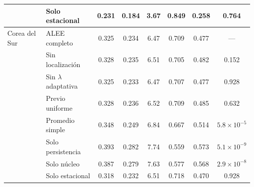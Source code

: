 \begin{longtable}{llcccccc}
 & Solo estacional & 0.231 & 0.184 & 3.67 & 0.849 & 0.258 & 0.764 \\
\midrule
Corea del Sur & ALEE completo & 0.325 & 0.234 & 6.47 & 0.709 & 0.477 & --- \\
 & Sin localización & 0.328 & 0.235 & 6.51 & 0.705 & 0.482 & 0.152 \\
 & Sin $\lambda$ adaptativa & 0.325 & 0.233 & 6.47 & 0.707 & 0.477 & 0.928 \\
 & Previo uniforme & 0.328 & 0.236 & 6.52 & 0.709 & 0.485 & 0.632 \\
 & Promedio simple & 0.348 & 0.249 & 6.84 & 0.667 & 0.514 & $5.8\times10^{-5}$ \\
 & Solo persistencia & 0.393 & 0.282 & 7.74 & 0.559 & 0.573 & $5.1\times10^{-9}$ \\
 & Solo núcleo & 0.387 & 0.279 & 7.63 & 0.577 & 0.568 & $2.9\times10^{-8}$ \\
 & Solo estacional & 0.318 & 0.232 & 6.51 & 0.718 & 0.470 & 0.928 \\
\end{longtable}